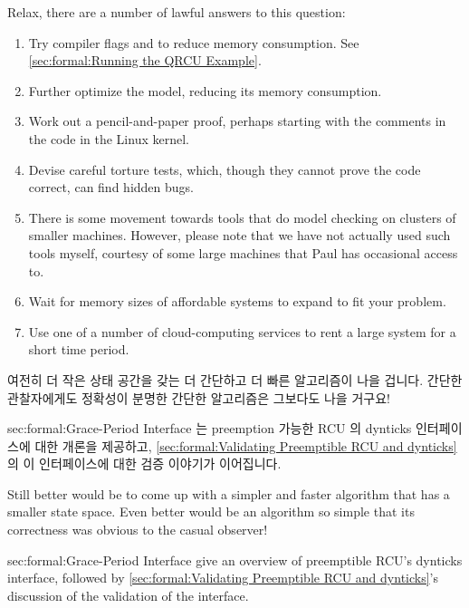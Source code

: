 {	Relax, there are a number of lawful answers to
	this question:
	\begin{enumerate}
	\item	Try compiler flags  and 
		to reduce memory consumption.
		See \cref{sec:formal:Running the QRCU Example}.
	\item	Further optimize the model, reducing its memory consumption.
	\item	Work out a pencil-and-paper proof, perhaps starting with the
		comments in the code in the Linux kernel.
	\item	Devise careful torture tests, which, though they cannot prove
		the code correct, can find hidden bugs.
	\item	There is some movement towards tools that do model
		checking on clusters of smaller machines.
		However, please note that we have not actually used such
		tools myself, courtesy of some large machines that Paul has
		occasional access to.
	\item	Wait for memory sizes of affordable systems to expand
		to fit your problem.
	\item	Use one of a number of cloud-computing services to rent
		a large system for a short time period.
	\end{enumerate}

	\fi

}\QuickQuizEnd

여전히 더 작은 상태 공간을 갖는 더 간단하고 더 빠른 알고리즘이 나을 겁니다.
간단한 관찰자에게도 정확성이 분명한 간단한 알고리즘은 그보다도 나을 거구요!

{sec:formal:Grace-Period Interface}
는 preemption 가능한 RCU 의 dynticks 인터페이스에 대한 개론을 제공하고,
\cref{sec:formal:Validating Preemptible RCU and dynticks} 의 이 인터페이스에
대한 검증 이야기가 이어집니다.

\iffalse

Still better would be to come up with a simpler and faster algorithm
that has a smaller state space.
Even better would be an algorithm so simple that its correctness was
obvious to the casual observer!

{sec:formal:Grace-Period Interface}
give an overview of preemptible RCU's dynticks interface,
followed by
\cref{sec:formal:Validating Preemptible RCU and dynticks}'s
discussion of the validation of the interface.

